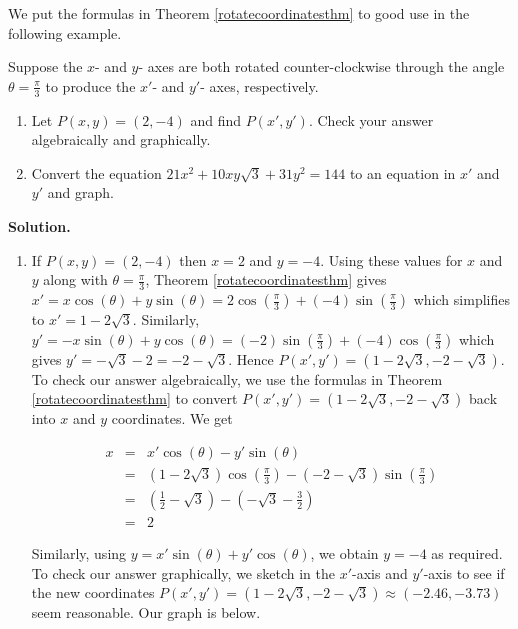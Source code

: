 \medskip

We put the formulas in  Theorem \ref{rotatecoordinatesthm} to good use in the following example.

\begin{ex} \label{rotatedaxesex1}  Suppose the $x$- and $y$- axes are both rotated counter-clockwise through the angle $\theta = \frac{\pi}{3}$ to produce the $x'$- and $y'$- axes, respectively. 


\begin{enumerate}

\item  Let $P(x,y) = (2,-4)$ and find $P(x',y')$.  Check your answer algebraically and graphically.

\item  \label{rotatedellipseex} Convert the equation $21x^2+10xy\sqrt{3}+31y^2=144$ to an equation in $x'$ and $y'$ and graph.

\end{enumerate}

{\bf Solution.}

\begin{enumerate}

 \item  If $P(x,y) = (2,-4)$ then $x=2$ and $y=-4$.  Using these values for $x$ and $y$ along with  $\theta = \frac{\pi}{3}$, Theorem \ref{rotatecoordinatesthm} gives
$x' = x \cos(\theta) + y \sin(\theta) = 2 \cos\left(\frac{\pi}{3}\right) + (-4)\sin\left(\frac{\pi}{3}\right)$ which simplifies to $x' = 1-2\sqrt{3}$.  Similarly,  $y' = -x\sin(\theta) + y\cos(\theta) = (-2)\sin\left(\frac{\pi}{3}\right) + (-4)\cos\left(\frac{\pi}{3}\right)$ which gives $y' = -\sqrt{3}-2 = -2-\sqrt{3}$.  Hence $P(x',y') = \left(1-2\sqrt{3}, -2-\sqrt{3}\right)$.  To check our answer algebraically,  we use the formulas in   Theorem \ref{rotatecoordinatesthm} to convert   $P(x',y') = \left(1-2\sqrt{3},-2-\sqrt{3}\right)$ back into $x$ and $y$ coordinates.  We get

\[ \begin{array}{rcl}
x  & = &  x' \cos(\theta) - y' \sin(\theta) \\ [3pt]
   & = & (1-2\sqrt{3}) \cos\left(\frac{\pi}{3}\right) - (-2-\sqrt{3})\sin\left(\frac{\pi}{3}\right) \\ [3pt]
   & = & \left(\frac{1}{2} - \sqrt{3} \right) -\left(-\sqrt{3} - \frac{3}{2}\right)\\ [3pt]
   & = & 2 \end{array} \] 
   
Similarly, using  $y =  x'\sin(\theta) + y'\cos(\theta)$, we obtain $y = -4$ as required.  To check our answer graphically, we sketch in the $x'$-axis and $y'$-axis to see if the new coordinates   $P(x',y') = \left(1-2\sqrt{3},-2-\sqrt{3}\right) \approx (-2.46,-3.73)$ seem reasonable.  Our graph is below.



\end{enumerate}
\end{ex}
